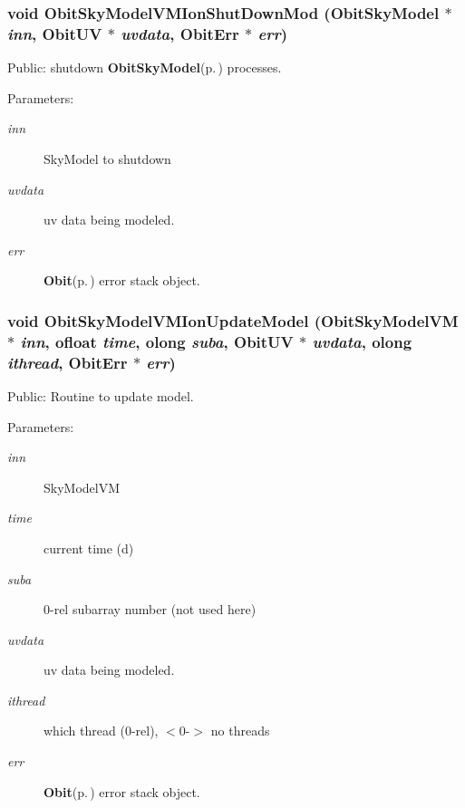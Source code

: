 \subsubsection{\setlength{\rightskip}{0pt plus 5cm}void Obit\-Sky\-Model\-VMIon\-Shut\-Down\-Mod ({\bf Obit\-Sky\-Model} $\ast$ {\em inn}, {\bf Obit\-UV} $\ast$ {\em uvdata}, {\bf Obit\-Err} $\ast$ {\em err})}\label{ObitSkyModelVMIon_8c_a13}


Public: shutdown {\bf Obit\-Sky\-Model}{\rm (p.\,\pageref{structObitSkyModel})} processes. 

\begin{Desc}
\item[Parameters:]
\begin{description}
\item[{\em inn}]Sky\-Model to shutdown \item[{\em uvdata}]uv data being modeled. \item[{\em err}]{\bf Obit}{\rm (p.\,\pageref{structObit})} error stack object. \end{description}
\end{Desc}
\subsubsection{\setlength{\rightskip}{0pt plus 5cm}void Obit\-Sky\-Model\-VMIon\-Update\-Model ({\bf Obit\-Sky\-Model\-VM} $\ast$ {\em inn}, {\bf ofloat} {\em time}, {\bf olong} {\em suba}, {\bf Obit\-UV} $\ast$ {\em uvdata}, {\bf olong} {\em ithread}, {\bf Obit\-Err} $\ast$ {\em err})}\label{ObitSkyModelVMIon_8c_a15}


Public: Routine to update model. 

\begin{Desc}
\item[Parameters:]
\begin{description}
\item[{\em inn}]Sky\-Model\-VM \item[{\em time}]current time (d) \item[{\em suba}]0-rel subarray number (not used here) \item[{\em uvdata}]uv data being modeled. \item[{\em ithread}]which thread (0-rel), $<$0-$>$ no threads \item[{\em err}]{\bf Obit}{\rm (p.\,\pageref{structObit})} error stack object. \end{description}
\end{Desc}
